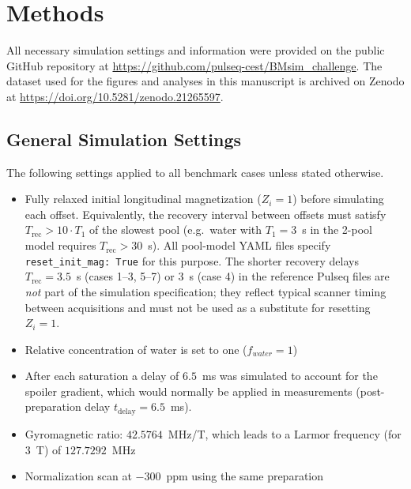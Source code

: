 \documentclass[11pt,a4paper]{article}
\begin{document}
\section{Methods}\label{methods}

All necessary simulation settings and information were provided on the public GitHub repository at \url{https://github.com/pulseq-cest/BMsim_challenge}. The dataset used for the figures and analyses in this manuscript is archived on Zenodo at \url{https://doi.org/10.5281/zenodo.21265597}.

\subsection{General Simulation Settings}
The following settings applied to all benchmark cases unless stated otherwise.
\begin{itemize}
    \item Fully relaxed initial longitudinal magnetization ($Z_i = 1$) before simulating each offset. Equivalently, the recovery interval between offsets must satisfy $T_{\mathrm{rec}} > 10 \cdot T_1$ of the slowest pool (e.g.\ water with $T_1=3$~s in the 2-pool model requires $T_{\mathrm{rec}} > 30$~s). All pool-model YAML files specify \texttt{reset\_init\_mag: True} for this purpose. The shorter recovery delays $T_{\mathrm{rec}}=3.5$~s (cases 1--3, 5--7) or $3$~s (case 4) in the reference Pulseq files are \emph{not} part of the simulation specification; they reflect typical scanner timing between acquisitions and must not be used as a substitute for resetting $Z_i=1$.
    \item Relative concentration of water is set to one ($f_{water}=1$)
    \item After each saturation a delay of $6.5$~ms was simulated to account for the spoiler gradient, which would normally be applied in measurements (post-preparation delay $t_{\mathrm{delay}} = 6.5$~ms).
    \item Gyromagnetic ratio: $42.5764$~MHz/T, which leads to a Larmor frequency (for $3$~T) of $127.7292$~MHz
    \item Normalization scan at $-300$~ppm using the same preparation
\end{itemize}
\end{document}
